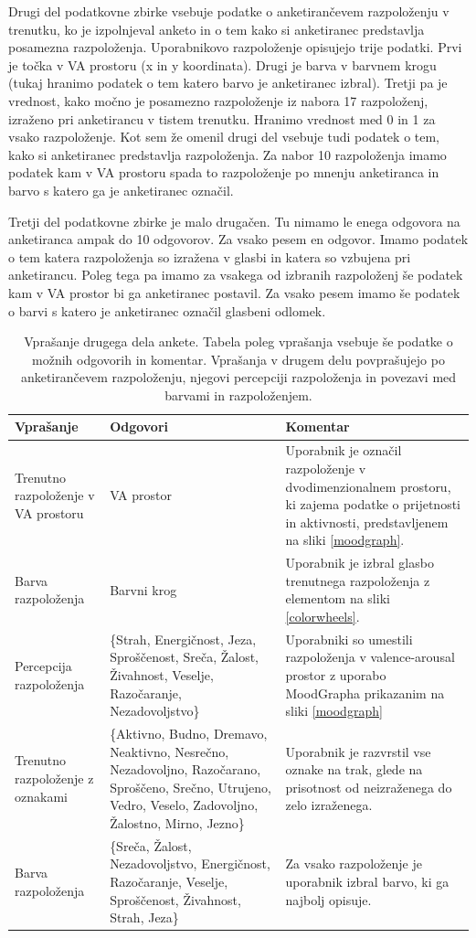 \documentclass[a4paper, 12pt]{book}
\begin{document}
{Drugi del podatkovne zbirke vsebuje podatke o anketirančevem razpoloženju v trenutku, ko je izpolnjeval anketo in o tem kako si anketiranec predstavlja posamezna razpoloženja. Uporabnikovo razpoloženje opisujejo trije podatki. Prvi je točka v VA prostoru (x in y koordinata). Drugi je barva v barvnem krogu (tukaj hranimo podatek o tem katero barvo je  anketiranec izbral). Tretji pa je vrednost, kako močno je posamezno razpoloženje iz nabora 17 razpoloženj, izraženo pri anketirancu v tistem trenutku. Hranimo vrednost med 0 in 1 za vsako razpoloženje. Kot sem že omenil drugi del vsebuje tudi podatek o tem, kako si anketiranec predstavlja razpoloženja. Za nabor 10 razpoloženja imamo podatek kam v VA prostoru spada to razpoloženje po mnenju anketiranca in barvo s katero ga je anketiranec označil. 

Tretji del podatkovne zbirke je malo drugačen. Tu nimamo le enega odgovora na anketiranca ampak do 10 odgovorov. Za vsako pesem en odgovor. Imamo podatek o tem katera razpoloženja so izražena v glasbi in katera so vzbujena pri anketirancu. Poleg tega pa imamo za vsakega od izbranih razpoloženj še podatek kam v VA prostor bi ga anketiranec postavil. Za vsako pesem imamo še podatek o barvi s katero je anketiranec označil glasbeni odlomek.  

\begin{table}[H]
\begin{center}
\caption{Vprašanje drugega dela ankete. Tabela poleg vprašanja vsebuje še podatke o možnih odgovorih in komentar. Vprašanja v drugem delu povprašujejo po anketirančevem razpoloženju, njegovi percepciji razpoloženja in povezavi med barvami in razpoloženjem.}
\begin{tabular}{| p{3.5cm} | p{4.5cm} | p{4.5cm} |}
\hline
Vprašanje & Odgovori & Komentar \\ \hline \hline
Trenutno razpoloženje v VA prostoru & VA prostor & Uporabnik je označil razpoloženje v dvodimenzionalnem prostoru, ki zajema podatke o prijetnosti in aktivnosti, predstavljenem na sliki \ref{moodgraph}. \\ \hline
Barva razpoloženja & Barvni krog & Uporabnik je izbral glasbo trenutnega razpoloženja z elementom na sliki \ref{colorwheels}. \\ \hline
Percepcija razpoloženja & \{Strah, Energičnost, Jeza, Sproščenost, Sreča, Žalost, Živahnost, Veselje, Razočaranje, Nezadovoljstvo\} & Uporabniki so umestili razpoloženja v valence-arousal prostor z uporabo MoodGrapha prikazanim na sliki \ref{moodgraph} \\ \hline
Trenutno razpoloženje z oznakami & \{Aktivno, Budno, Dremavo, Neaktivno, Nesrečno, Nezadovoljno, Razočarano, Sproščeno, Srečno, Utrujeno, Vedro, Veselo, Zadovoljno, Žalostno, Mirno, Jezno\} & Uporabnik je razvrstil vse oznake na trak, glede na prisotnost od neizraženega do zelo izraženega. \\ \hline
Barva razpoloženja & \{Sreča, Žalost, Nezadovoljstvo, Energičnost, Razočaranje, Veselje, Sproščenost, Živahnost, Strah, Jeza\} & Za vsako razpoloženje je uporabnik izbral barvo, ki ga najbolj opisuje. \\ \hline


\end{tabular}
\end{center}
\end{table}}
\end{document}
